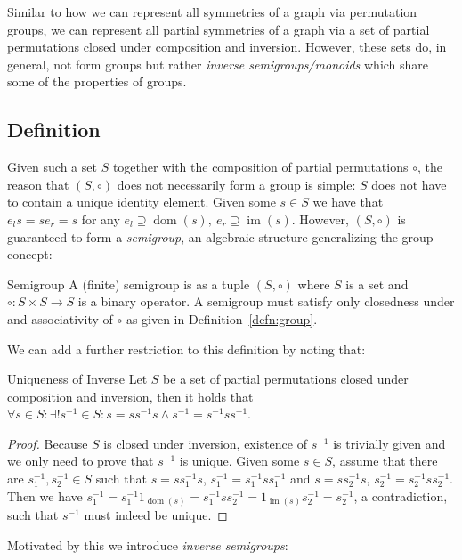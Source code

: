 Similar to how we can represent all symmetries of a graph via permutation
groups, we can represent all partial symmetries of a graph via a set of partial
permutations closed under composition and inversion. However, these sets do, in
general, not form groups but rather \textit{inverse semigroups/monoids} which
share some of the properties of groups.

\subsection{Definition}

Given such a set $S$ together with the composition of partial permutations
$\circ$, the reason that $(S, \circ)$ does not necessarily form a group is
simple: $S$ does not have to contain a unique identity element. Given some $s
\in S$ we have that $e_ls = se_r = s$ for any $e_l \supseteq
\operatorname{dom}(s),\ e_r \supseteq \operatorname{im}(s)$. However, $(S,
\circ)$ is guaranteed to form a \textit{semigroup}, an algebraic structure
generalizing the group concept:

\begin{defn}{Semigroup}
A (finite) semigroup is as a tuple $(S, \circ)$ where $S$ is a set and
$\circ: S \times S \rightarrow S$ is a binary operator. A semigroup must
satisfy only closedness under and associativity of $\circ$ as given in
Definition~\ref{defn:group}.
\end{defn}
%
We can add a further restriction to this definition by noting that:

\begin{lemma}{Uniqueness of Inverse}
  Let $S$ be a set of partial permutations closed under composition and
  inversion, then it holds that $\forall s \in S: \exists! s^{-1} \in S: s = s
  s^{-1} s \land s^{-1} = s^{-1} s s^{-1}$.
\end{lemma}

\begin{proof}
  Because $S$ is closed under inversion, existence of $s^{-1}$ is trivially
  given and we only need to prove that $s^{-1}$ is unique. Given some $s \in S$,
  assume that there are $s^{-1}_1, s^{-1}_2 \in S$ such that $s = s s^{-1}_1 s$,
  $s^{-1}_1 = s^{-1}_1 s s^{-1}_1$ and $s = s s^{-1}_2 s$, $s^{-1}_2 = s^{-1}_2 s
  s^{-1}_2$. Then we have $s^{-1}_1 = s^{-1}_1 1_{\operatorname{dom}(s)} =
  s^{-1}_1 s s^{-1}_2 = 1_{\operatorname{im}(s)} s^{-1}_2 = s^{-1}_2$, a
  contradiction, such that $s^{-1}$ must indeed be unique.
\end{proof}
%
Motivated by this we introduce \textit{inverse semigroups}:

